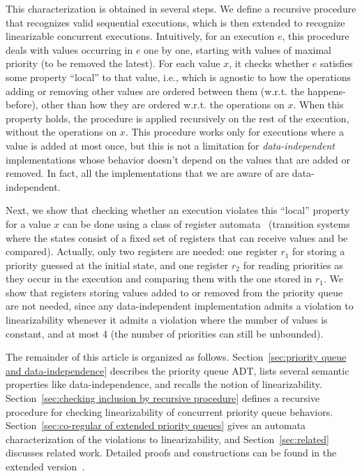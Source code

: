 \documentclass[a4paper,UKenglish]{lipics-v2016}
\begin{document}
This characterization is obtained in several steps. We define a recursive procedure that recognizes valid sequential executions, which is then extended to recognize linearizable concurrent executions. Intuitively, for an execution $e$, this procedure deals with values occurring in $e$ one by one, starting with values of maximal priority (to be removed the latest). For each value $x$, it checks whether $e$ satisfies some property ``local'' to that value, i.e., which is agnostic to how the operations adding or removing other values are ordered between them (w.r.t. the happens-before), other than how they are ordered w.r.t. the operations on $x$. When this property holds, the procedure is applied recursively on the rest of the execution, without the operations on $x$. This procedure works only for executions where a value is added at most once, but this is not a limitation for \emph{data-independent} implementations whose behavior doesn't depend on the values that are added or removed. In fact, all the implementations that we are aware of are data-independent.

Next, we show that checking whether an execution violates this ``local'' property for a value $x$ can be done using a class of register automata~\cite{DBLP:journals/tcs/KaminskiF94,DBLP:conf/icalp/Cerans94,DBLP:conf/stacs/SegoufinT11} (transition systems where the states consist of a fixed set of registers that can receive values and be compared). Actually, only two registers are needed: one register $r_1$ for storing a priority guessed at the initial state, and one register $r_2$ for reading priorities as they occur in the execution and comparing them with the one stored in $r_1$. We show that registers storing values added to or removed from the priority queue are not needed, since any data-independent implementation admits a violation to linearizability whenever it admits a violation where the number of values is constant, and at most 4 (the number of priorities can still be unbounded).

The remainder of this article is organized as follows.
Section~\ref{sec:priority queue and data-independence} describes the priority queue ADT, lists several semantic properties like data-independence, and recalls the notion of linearizability.
Section~\ref{sec:checking inclusion by recursive procedure} defines a recursive procedure for checking linearizability of concurrent priority queue behaviors.
Section~\ref{sec:co-regular of extended priority queues} gives an automata characterization of the violations to linearizability, and
Section~\ref{sec:related} discusses related work. Detailed proofs and constructions can be found in the extended version~\cite{CONCUR2017Ahmed}.
\end{document}
